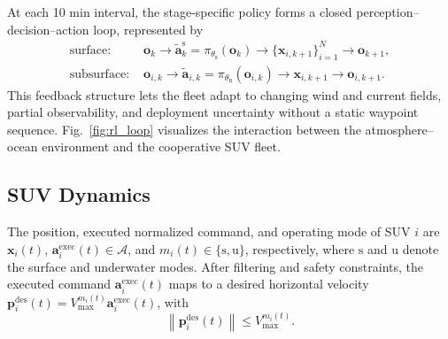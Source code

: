 \documentclass[a4paper,fleqn]{cas-dc}
\begin{document}
At each 10 min interval, the stage-specific policy forms a closed
perception--decision--action loop, represented by
\begin{equation}
\begin{aligned}
\text{surface: }&
\mathbf{o}_{k}\rightarrow
\tilde{\mathbf{a}}_{k}^{\mathrm{s}}=\pi_{\theta_{\mathrm{s}}}(\mathbf{o}_{k})
\rightarrow
\{\mathbf{x}_{i,k+1}\}_{i=1}^{N}
\rightarrow
\mathbf{o}_{k+1},\\
\text{subsurface: }&
\mathbf{o}_{i,k}\rightarrow
\tilde{\mathbf{a}}_{i,k}=\pi_{\theta_{\mathrm{u}}}(\mathbf{o}_{i,k})
\rightarrow
\mathbf{x}_{i,k+1}
\rightarrow
\mathbf{o}_{i,k+1}.
\end{aligned}
\label{eq:closed_loop}
\end{equation}
This feedback structure lets the fleet adapt to changing wind and current fields,
partial observability, and deployment uncertainty without a static waypoint
sequence. Fig.~\ref{fig:rl_loop} visualizes the interaction between the
atmosphere--ocean environment and the cooperative SUV fleet.

\subsection{SUV Dynamics}
\label{subsec:dynamic_constraints}

The position, executed normalized command, and operating mode of SUV \(i\) are
\(\mathbf{x}_i(t)\),
\(\mathbf{a}_i^{\mathrm{exec}}(t)\in\mathcal{A}\), and
$m_i(t)\in\{\mathrm{s},\mathrm{u}\}$, respectively, where $\mathrm{s}$ and
$\mathrm{u}$ denote the surface and underwater modes. After filtering and
safety constraints, the executed command
\(\mathbf{a}_i^{\mathrm{exec}}(t)\) maps to a desired horizontal
velocity \(\mathbf{p}_i^{\mathrm{des}}(t)
=V_{\max}^{m_i(t)}\mathbf{a}_i^{\mathrm{exec}}(t)\), with
\begin{equation}
\left\|\mathbf{p}_i^{\mathrm{des}}(t)\right\|\leq V_{\max}^{m_i(t)}.
\label{eq:speed_constraint}
\end{equation}
\end{document}
